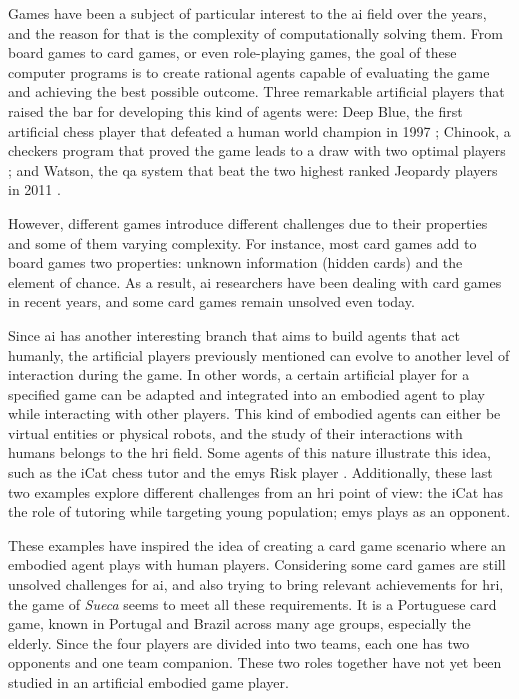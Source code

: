 \label{chapter:introduction}

Games have been a subject of particular interest to the \ac{ai} field over the years, and the reason for that is the complexity of computationally solving them.
From board games to card games, or even role-playing games, the goal of these computer programs is to create rational agents capable of evaluating the game and achieving the best possible outcome.
Three remarkable artificial players that raised the bar for developing this kind of agents were: Deep Blue, the first artificial chess player that defeated a human world champion in 1997 \cite{Campbell2002}; Chinook, a checkers program that proved the game leads to a draw with two optimal players \cite{Schaeffer1996}; and Watson, the \ac{qa} system that beat the two highest ranked Jeopardy players in 2011 \cite{Ferrucci2010}.

However, different games introduce different challenges due to their properties and some of them varying complexity.
For instance, most card games add to board games two properties: unknown information (hidden cards) and the element of chance.
As a result, \ac{ai} researchers have been dealing with card games in recent years, and some card games remain unsolved even today.

Since \ac{ai} has another interesting branch that aims to build agents that act humanly, the artificial players previously mentioned can evolve to another level of interaction during the game.
In other words, a certain artificial player for a specified game can be adapted and integrated into an embodied agent to play while interacting with other players.
This kind of embodied agents can either be virtual entities or physical robots, and the study of their interactions with humans belongs to the \ac{hri} field.
Some agents of this nature illustrate this idea, such as the iCat chess tutor \cite{Affective2007} and the \ac{emys} Risk player \cite{Pereira}.
Additionally, these last two examples explore different challenges from an \ac{hri} point of view: the iCat has the role of tutoring while targeting young population; \ac{emys} plays as an opponent.

These examples have inspired the idea of creating a card game scenario where an embodied agent plays with human players.
Considering some card games are still unsolved challenges for \ac{ai}, and also trying to bring relevant achievements for \ac{hri}, the game of \emph{Sueca} seems to meet all these requirements.
It is a Portuguese card game, known in Portugal and Brazil across many age groups, especially the elderly.
Since the four players are divided into two teams, each one has two opponents and one team companion.
These two roles together have not yet been studied in an artificial embodied game player.

